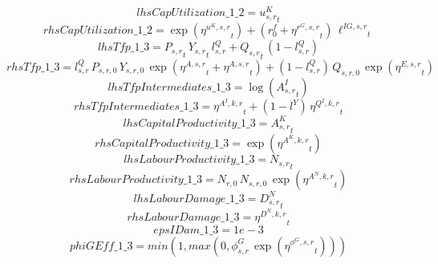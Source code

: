 \begin{dmath*}
lhsCapUtilization\_1\_2 = {{u^K_{s,r}}}_{t}
\end{dmath*}
\begin{dmath*}
rhsCapUtilization\_1\_2 = \exp\left({{\eta^{u^K,s,r}}}_{t}\right)+\left({{r^f_0}}+{{\eta^{r^G,s,r}}}_{t}\right)\, {{\ell^{IG,s,r}}}_{t}
\end{dmath*}
\begin{dmath*}
lhsTfp\_1\_3 = {{P_{s,r}}}_{t}\, {{Y_{s,r}}}_{t}\, {{l^{Q}_{s,r}}}+{{Q_{s,r}}}_{t}\, \left(1-{{l^{Q}_{s,r}}}\right)
\end{dmath*}
\begin{dmath*}
rhsTfp\_1\_3 = {{l^{Q}_{s,r}}}\, {{P_{s,r,0}}}\, {{Y_{s,r,0}}}\, \exp\left({{\eta^{A,s,r}}}_{t}+{{\eta^{A,s,r}}}_{t}\right)+\left(1-{{l^{Q}_{s,r}}}\right)\, {{Q_{s,r,0}}}\, \exp\left({{\eta^{E,s,r}}}_{t}\right)
\end{dmath*}
\begin{dmath*}
lhsTfpIntermediates\_1\_3 = \log\left({{A^{I}_{s,r}}}_{t}\right)
\end{dmath*}
\begin{dmath*}
rhsTfpIntermediates\_1\_3 = {{\eta^{A^{I},k,r}}}_{t}+\left(1-{{l^{Y}}}\right)\, {{\eta^{Q^{I},k,r}}}_{t}
\end{dmath*}
\begin{dmath*}
lhsCapitalProductivity\_1\_3 = {{A^{K}_{s,r}}}_{t}
\end{dmath*}
\begin{dmath*}
rhsCapitalProductivity\_1\_3 = \exp\left({{\eta^{A^{K},k,r}}}_{t}\right)
\end{dmath*}
\begin{dmath*}
lhsLabourProductivity\_1\_3 = {{N_{s,r}}}_{t}
\end{dmath*}
\begin{dmath*}
rhsLabourProductivity\_1\_3 = {{N_{r,0}}}\, {{N_{s,r,0}}}\, \exp\left({{\eta^{A^{N},k,r}}}_{t}\right)
\end{dmath*}
\begin{dmath*}
lhsLabourDamage\_1\_3 = {{D^N_{s,r}}}_{t}
\end{dmath*}
\begin{dmath*}
rhsLabourDamage\_1\_3 = {{\eta^{D^{N},k,r}}}_{t}
\end{dmath*}
\begin{dmath*}
epsIDam\_1\_3 = 1e-3
\end{dmath*}
\begin{dmath*}
phiGEff\_1\_3 = min(1,max(0,{{\phi^{G}_{s,r}}}\, \exp\left({{\eta^{\phi^{G},s,r}}}_{t}\right)))
\end{dmath*}
